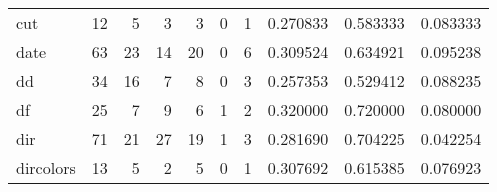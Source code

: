 \begin{tabular}{lrrrrrrrrr}
cut       &                                      12 &                                                  5 &                                                  3 &                                                  3 &                                                  0 &                                                  1 &                                           0.270833 &                               0.583333 &                             0.083333 \\
date      &                                      63 &                                                 23 &                                                 14 &                                                 20 &                                                  0 &                                                  6 &                                           0.309524 &                               0.634921 &                             0.095238 \\
dd        &                                      34 &                                                 16 &                                                  7 &                                                  8 &                                                  0 &                                                  3 &                                           0.257353 &                               0.529412 &                             0.088235 \\
df        &                                      25 &                                                  7 &                                                  9 &                                                  6 &                                                  1 &                                                  2 &                                           0.320000 &                               0.720000 &                             0.080000 \\
dir       &                                      71 &                                                 21 &                                                 27 &                                                 19 &                                                  1 &                                                  3 &                                           0.281690 &                               0.704225 &                             0.042254 \\
dircolors &                                      13 &                                                  5 &                                                  2 &                                                  5 &                                                  0 &                                                  1 &                                           0.307692 &                               0.615385 &                             0.076923 \\

\end{tabular}

